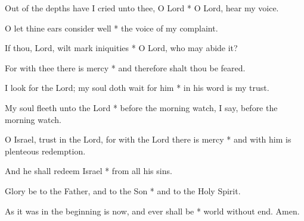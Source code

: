 Out of the depths have I cried unto thee, O Lord * O Lord, hear my voice.

O let thine ears consider well * the voice of my complaint.
	
If thou, Lord, wilt mark iniquities * O Lord, who may abide it?
	
For with thee there is mercy  * and therefore shalt thou be feared.
	
I look for the Lord; my soul doth wait for him * in his word is my trust.
	
My soul fleeth unto the Lord * before the morning watch, I say, before the morning watch.
	
O Israel, trust in the Lord, for with the Lord there is mercy * and with him is plenteous redemption.
	
And he shall redeem Israel * from all his sins.
	
Glory be to the Father, and to the Son * and to the Holy Spirit.
	
As it was in the beginning is now, and ever shall be * world without end. Amen.
